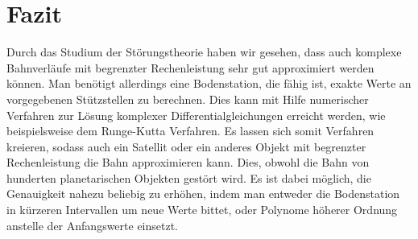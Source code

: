 \section{Fazit}
Durch das Studium der Störungstheorie haben wir gesehen, dass auch komplexe Bahnverläufe mit begrenzter Rechenleistung sehr gut approximiert werden können.
Man benötigt allerdings eine Bodenstation, die fähig ist, exakte Werte an vorgegebenen Stützstellen zu berechnen.
Dies kann mit Hilfe numerischer Verfahren zur Lösung komplexer Differentialgleichungen erreicht werden, wie beispielsweise dem Runge-Kutta Verfahren.
Es lassen sich somit Verfahren kreieren, sodass auch ein Satellit oder ein anderes Objekt mit begrenzter Rechenleistung die Bahn approximieren kann.
Dies, obwohl die Bahn von hunderten planetarischen Objekten gestört wird.
Es ist dabei möglich, die Genauigkeit nahezu beliebig zu erhöhen, indem man entweder die Bodenstation in kürzeren Intervallen um neue Werte bittet,
oder Polynome höherer Ordnung anstelle der Anfangswerte einsetzt.